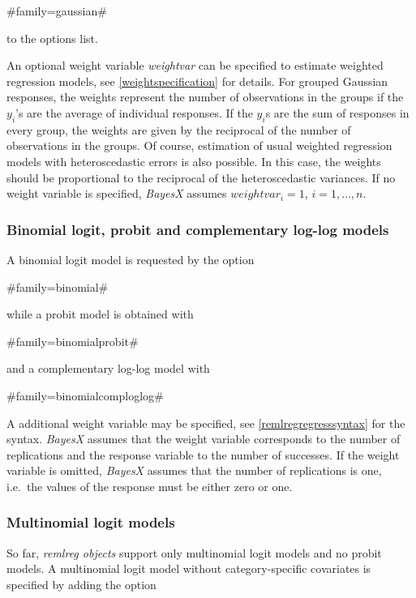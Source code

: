 #family=gaussian#

to the options list.

An optional weight variable {\em weightvar} can be specified to
estimate weighted regression models, see
\autoref{weightspecification} for details. For grouped Gaussian
responses, the weights represent the number of observations in the
groups if the $y_i$'s are the average of individual responses. If
the $y_i$s are the sum of responses in every group, the weights are
given by the reciprocal of the number of observations in the groups.
Of course, estimation of usual weighted regression models with
heteroscedastic errors is also possible. In this case, the weights
should be proportional to the reciprocal of the heteroscedastic
variances. If no weight variable is specified, {\em BayesX} assumes
$weightvar_i = 1$, $i=1,\dots,n$.

\subsubsection*{Binomial logit, probit and complementary log-log
models}

A binomial logit model is requested by the option

#family=binomial#

while a probit model is obtained with

#family=binomialprobit#

and a complementary log-log model with

#family=binomialcomploglog#

A additional weight variable may be specified, see
\autoref{remlregregresssyntax} for the syntax. {\em BayesX} assumes
that the weight variable corresponds to the number of replications
and the response variable to the number of successes. If the weight
variable is omitted, {\em BayesX} assumes that the number of
replications is one, i.e.~the values of the response must be either
zero or one.

\subsubsection*{Multinomial logit models}

So far, {\em remlreg objects} support only multinomial logit models
and no probit models. A multinomial logit model without
category-specific covariates is specified by adding the option

